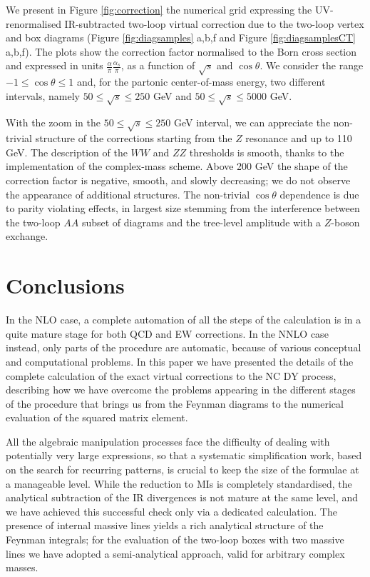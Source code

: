 \documentclass[11pt,a4paper]{article}
\begin{document}
We present in Figure \ref{fig:correction}
the numerical grid expressing the UV-renormalised IR-subtracted
two-loop \oaas virtual correction
due to the two-loop vertex and box diagrams (Figure \ref{fig:diagsamples} a,b,f and Figure \ref{fig:diagsamplesCT} a,b,f).
The plots show the correction factor normalised to the Born cross section
and expressed in units $\frac{\alpha}{\pi} \frac{\alpha_s}{\pi}$,
as a function of $\sqrt{s}$ and $\cos\theta$.
We consider the range $-1\leq\cos\theta\leq 1$ and,
for the partonic center-of-mass energy, two different intervals,
namely $50\leq\sqrt{s}\leq 250$ GeV and $50\leq\sqrt{s}\leq 5000$ GeV.

With the zoom in the $50\leq\sqrt{s}\leq 250$ GeV interval,
we can appreciate the non-trivial structure of the corrections
starting from the $Z$ resonance and up to 110 GeV.
The description of the $WW$ and $ZZ$ thresholds is smooth,
thanks to the implementation of the complex-mass scheme.
Above 200 GeV the shape of the correction factor is negative, smooth,
and slowly decreasing;
we do not observe the appearance of additional structures.
The non-trivial $\cos\theta$ dependence is due to parity violating effects,
in largest size stemming from the interference between the two-loop
$AA$ subset of diagrams and the tree-level amplitude with a $Z$-boson exchange.






\section{Conclusions}
\label{sec:conclusions}
In the NLO case, a complete automation of all the steps of
the calculation is in a quite mature stage for both QCD and EW corrections.
In the  NNLO case instead, only parts of the procedure are automatic,
because of various conceptual and computational problems.
In this paper we have presented the details of the complete calculation
of the exact \oaas virtual corrections to the NC DY process,
describing how we have overcome the problems
appearing in the different stages of the procedure
that brings us from the Feynman diagrams
to the numerical evaluation of the squared matrix element.

All the algebraic manipulation processes face the difficulty of dealing with
potentially very large expressions, so that a systematic simplification
work, based on the search for recurring patterns,
is crucial to keep the size of the formulae at a manageable level.
While the reduction to MIs is completely standardised,
the analytical subtraction of the IR divergences
is not mature at the same level,
and we have achieved this successful check only via a dedicated calculation.
The presence of internal massive lines yields a rich analytical structure
of the Feynman integrals;
for the evaluation of the two-loop boxes with two massive lines
we have adopted a semi-analytical approach, valid for arbitrary complex masses.
\end{document}
